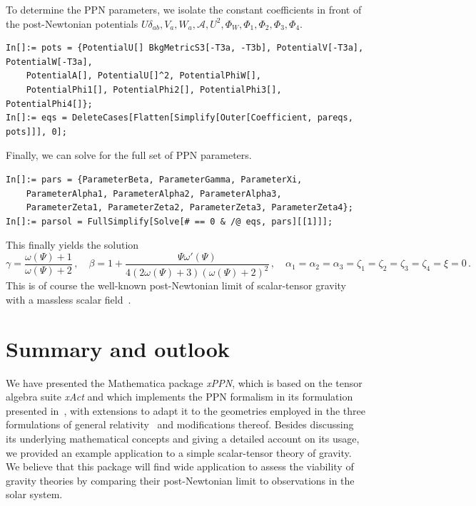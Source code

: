 \documentclass[notitlepage,a4paper,aps,prd,onecolumn,superscriptaddress,nofootinbib,groupedaddress,longbibliography]{revtex4-1}
\newcommand{\xPPN}{\emph{xPPN}}
\newcommand{\xAct}{\emph{xAct}}
\begin{document}
To determine the PPN parameters, we isolate the constant coefficients in front of the post-Newtonian potentials \(U\delta_{ab}, V_a, W_a, \mathcal{A}, U^2, \Phi_W, \Phi_1, \Phi_2, \Phi_3, \Phi_4\).
\begin{lstlisting}
In[]:= pots = {PotentialU[] BkgMetricS3[-T3a, -T3b], PotentialV[-T3a], PotentialW[-T3a],
	PotentialA[], PotentialU[]^2, PotentialPhiW[],
	PotentialPhi1[], PotentialPhi2[], PotentialPhi3[], PotentialPhi4[]};
In[]:= eqs = DeleteCases[Flatten[Simplify[Outer[Coefficient, pareqs, pots]]], 0];
\end{lstlisting}
Finally, we can solve for the full set of PPN parameters.
\begin{lstlisting}
In[]:= pars = {ParameterBeta, ParameterGamma, ParameterXi,
	ParameterAlpha1, ParameterAlpha2, ParameterAlpha3,
	ParameterZeta1, ParameterZeta2, ParameterZeta3, ParameterZeta4};
In[]:= parsol = FullSimplify[Solve[# == 0 & /@ eqs, pars][[1]]];
\end{lstlisting}
This finally yields the solution
\begin{equation}\label{eq:exppnpar}
\gamma = \frac{\omega(\Psi) + 1}{\omega(\Psi) + 2}\,, \quad
\beta = 1 + \frac{\Psi\omega'(\Psi)}{4(2\omega(\Psi) + 3)(\omega(\Psi) + 2)^2}\,, \quad
\alpha_1 = \alpha_2 = \alpha_3 = \zeta_1 = \zeta_2 = \zeta_3 = \zeta_4 = \xi = 0\,.
\end{equation}
This is of course the well-known post-Newtonian limit of scalar-tensor gravity with a massless scalar field~\cite{Nordtvedt:1970uv}.

\section{Summary and outlook}\label{sec:conclusion}
We have presented the Mathematica package \xPPN, which is based on the tensor algebra suite \xAct{} and which implements the PPN formalism in its formulation presented in~\cite{Will:1993ns}, with extensions to adapt it to the geometries employed in the three formulations of general relativity~\cite{BeltranJimenez:2019tjy} and modifications thereof. Besides discussing its underlying mathematical concepts and giving a detailed account on its usage, we provided an example application to a simple scalar-tensor theory of gravity. We believe that this package will find wide application to assess the viability of gravity theories by comparing their post-Newtonian limit to observations in the solar system.
\end{document}
